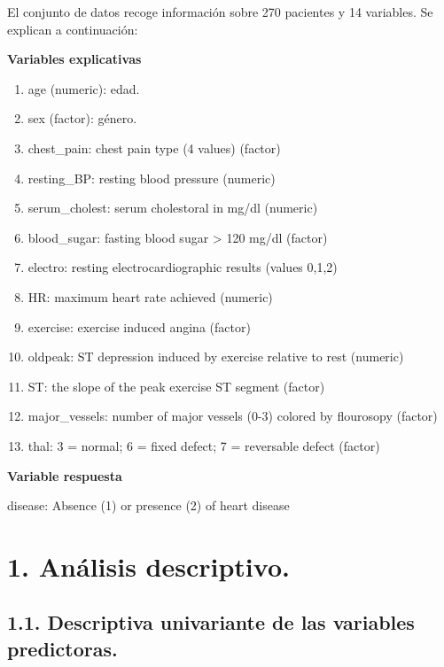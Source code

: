 \documentclass[]{article}
\providecommand{\tightlist}{%
  \setlength{\itemsep}{0pt}\setlength{\parskip}{0pt}}
\begin{document}
El conjunto de datos recoge información sobre 270 pacientes y 14
variables. Se explican a continuación:

\textbf{Variables explicativas}

\begin{enumerate}
\def\labelenumi{\arabic{enumi}.}
\tightlist
\item
  age (numeric): edad.
\item
  sex (factor): género.
\item
  chest\_pain: chest pain type (4 values) (factor)
\item
  resting\_BP: resting blood pressure (numeric)
\item
  serum\_cholest: serum cholestoral in mg/dl (numeric)
\item
  blood\_sugar: fasting blood sugar \textgreater{} 120 mg/dl (factor)
\item
  electro: resting electrocardiographic results (values 0,1,2)
\item
  HR: maximum heart rate achieved (numeric)
\item
  exercise: exercise induced angina (factor)
\item
  oldpeak: ST depression induced by exercise relative to rest (numeric)
\item
  ST: the slope of the peak exercise ST segment (factor)
\item
  major\_vessels: number of major vessels (0-3) colored by flourosopy
  (factor)
\item
  thal: 3 = normal; 6 = fixed defect; 7 = reversable defect (factor)
\end{enumerate}

\textbf{Variable respuesta}

disease: Absence (1) or presence (2) of heart disease

\section{1. Análisis descriptivo.}\label{analisis-descriptivo.}

\subsection{1.1. Descriptiva univariante de las variables
predictoras.}\label{descriptiva-univariante-de-las-variables-predictoras.}
\end{document}
